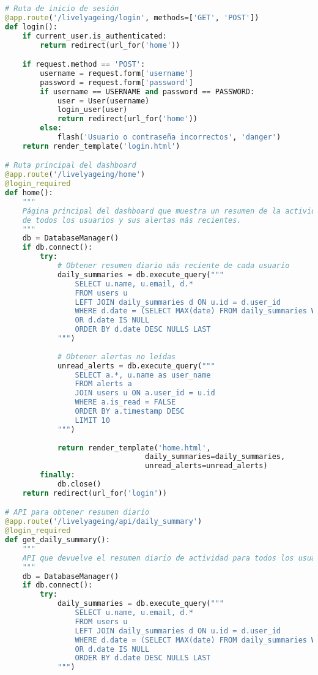 \begin{lstlisting}[language=Python, caption=Implementación de rutas principales en Flask]
# Ruta de inicio de sesión
@app.route('/livelyageing/login', methods=['GET', 'POST'])
def login():
    if current_user.is_authenticated:
        return redirect(url_for('home'))

    if request.method == 'POST':
        username = request.form['username']
        password = request.form['password']
        if username == USERNAME and password == PASSWORD:
            user = User(username)
            login_user(user)
            return redirect(url_for('home'))
        else:
            flash('Usuario o contraseña incorrectos', 'danger')
    return render_template('login.html')

# Ruta principal del dashboard
@app.route('/livelyageing/home')
@login_required
def home():
    """
    Página principal del dashboard que muestra un resumen de la actividad
    de todos los usuarios y sus alertas más recientes.
    """
    db = DatabaseManager()
    if db.connect():
        try:
            # Obtener resumen diario más reciente de cada usuario
            daily_summaries = db.execute_query("""
                SELECT u.name, u.email, d.*
                FROM users u
                LEFT JOIN daily_summaries d ON u.id = d.user_id
                WHERE d.date = (SELECT MAX(date) FROM daily_summaries WHERE user_id = u.id)
                OR d.date IS NULL
                ORDER BY d.date DESC NULLS LAST
            """)
            
            # Obtener alertas no leídas
            unread_alerts = db.execute_query("""
                SELECT a.*, u.name as user_name
                FROM alerts a
                JOIN users u ON a.user_id = u.id
                WHERE a.is_read = FALSE
                ORDER BY a.timestamp DESC
                LIMIT 10
            """)
            
            return render_template('home.html',
                                daily_summaries=daily_summaries,
                                unread_alerts=unread_alerts)
        finally:
            db.close()
    return redirect(url_for('login'))

# API para obtener resumen diario
@app.route('/livelyageing/api/daily_summary')
@login_required
def get_daily_summary():
    """
    API que devuelve el resumen diario de actividad para todos los usuarios.
    """
    db = DatabaseManager()
    if db.connect():
        try:
            daily_summaries = db.execute_query("""
                SELECT u.name, u.email, d.*
                FROM users u
                LEFT JOIN daily_summaries d ON u.id = d.user_id
                WHERE d.date = (SELECT MAX(date) FROM daily_summaries WHERE user_id = u.id)
                OR d.date IS NULL
                ORDER BY d.date DESC NULLS LAST
            """)
            

\end{lstlisting}
